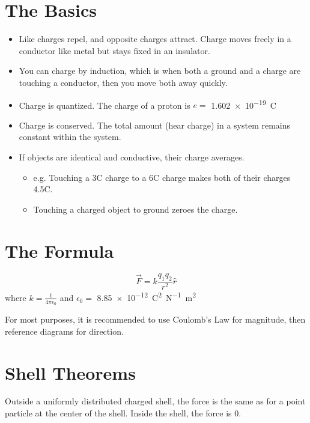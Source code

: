 \documentclass[]{article}
\begin{document}
\section{The Basics}
\begin{itemize}
  \item Like charges repel, and opposite charges attract. Charge moves freely in a conductor like metal but stays fixed in an insulator.
  \item You can charge by induction, which is when both a ground and a charge are touching a conductor, then you move both away quickly.
  \item Charge is quantized. The charge of a proton is $ e = $ \qty{1.602e-19}{\coulomb}
  \item Charge is conserved. The total amount (hear charge) in a system remains constant within the system.
  \item If objects are identical and conductive, their charge averages.
    \begin{itemize}
      \item e.g. Touching a 3C charge to a 6C charge makes both of their charges 4.5C.
      \item Touching a charged object to ground zeroes the charge.
    \end{itemize}
\end{itemize}

\section{The Formula}
\[ \vec{F} = k \frac{q_1 q_2}{r^2} \hat{r} \]
where $ k = \frac{1}{4 \pi \epsilon_0} $ and $ \epsilon_0 = $ \qty{8.85e-12}{\coulomb\squared\per\newton\meter\squared}

For most purposes, it is recommended to use Coulomb's Law for magnitude, then reference diagrams for direction.

\section{Shell Theorems}
Outside a uniformly distributed charged shell, the force is the same as for a point particle at the center of the shell. Inside the shell, the force is 0.
\end{document}
